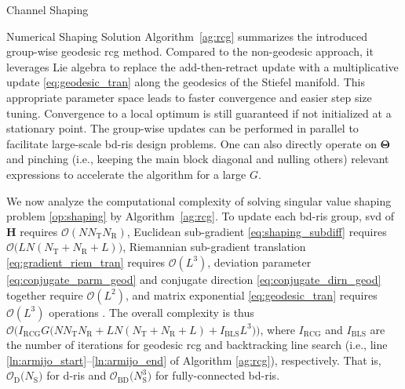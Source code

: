 \documentclass[journal]{IEEEtran}
\begin{document}
\begin{section}{Channel Shaping}
\begin{subsection}{Numerical Shaping Solution}
		Algorithm~\ref{ag:rcg} summarizes the introduced group-wise geodesic \gls{rcg} method.
		Compared to the non-geodesic approach, it leverages Lie algebra to replace the add-then-retract update with a multiplicative update \eqref{eq:geodesic_tran} along the geodesics of the Stiefel manifold.
		This appropriate parameter space leads to faster convergence and easier step size tuning.
		Convergence to a local optimum is still guaranteed if not initialized at a stationary point.
		The group-wise updates can be performed in parallel to facilitate large-scale \gls{bd}-\gls{ris} design problems.
		One can also directly operate on $\mathbf{\Theta}$ and pinching (i.e., keeping the main block diagonal and nulling others) relevant expressions to accelerate the algorithm for a large $G$.

		We now analyze the computational complexity of solving singular value shaping problem \eqref{op:shaping} by Algorithm~\ref{ag:rcg}.
		To update each \gls{bd}-\gls{ris} group, \gls{svd} of $\mathbf{H}$ requires $\mathcal{O}(N N_\mathrm{T} N_\mathrm{R})$, Euclidean sub-gradient \eqref{eq:shaping_subdiff} requires $\mathcal{O}\bigl(L N (N_\mathrm{T}+N_\mathrm{R}+L) \bigr)$, Riemannian sub-gradient translation \eqref{eq:gradient_riem_tran} requires $\mathcal{O}(L^3)$, deviation parameter \eqref{eq:conjugate_parm_geod} and conjugate direction \eqref{eq:conjugate_dirn_geod} together require $\mathcal{O}(L^2)$, and matrix exponential \eqref{eq:geodesic_tran} requires $\mathcal{O}(L^3)$ operations \cite{Moler2003}.
		The overall complexity is thus $\mathcal{O}\bigl(I_\text{RCG} G \bigl(N N_\mathrm{T} N_\mathrm{R} + L N (N_\mathrm{T}+N_\mathrm{R}+L) + I_\text{BLS} L^3\bigr)\bigr)$, where $I_\text{RCG}$ and $I_\text{BLS}$ are the number of iterations for geodesic \gls{rcg} and backtracking line search (i.e., line \ref{ln:armijo_start}--\ref{ln:armijo_end} of Algorithm \ref{ag:rcg}), respectively.
		That is, $\mathcal{O}_\mathrm{D}\bigl(N_\mathrm{S}\bigr)$ for \gls{d}-\gls{ris} and $\mathcal{O}_\mathrm{BD}\bigl(N_\mathrm{S}^3\bigr)$ for fully-connected \gls{bd}-\gls{ris}.


\end{subsection}
\end{section}
\end{document}
